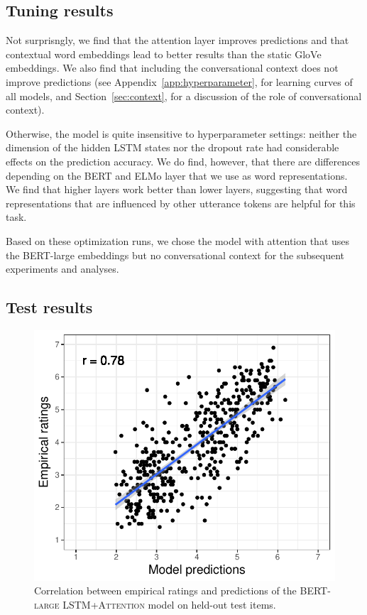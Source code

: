 \documentclass[11pt,a4paper]{article}
\begin{document}
\subsection{Tuning results}

Not surprisngly, we find that the attention layer improves predictions and that contextual word embeddings lead to better results than the static GloVe
embeddings. We also find that including the conversational context does not improve predictions (see Appendix~\ref{app:hyperparameter}, for learning curves of all models, and Section~\ref{sec:context}, for a discussion of the role of conversational context).

Otherwise, the model is quite insensitive to hyperparameter settings: neither the dimension of the hidden LSTM states nor the dropout rate had considerable effects
on the prediction accuracy. We do find, however, that there are differences depending on the BERT and ELMo layer that we use as word representations.
We find that higher layers work better than lower layers, suggesting that word representations that are influenced by other utterance tokens are helpful for this 
task.%

Based on these optimization runs, we chose the model with attention that uses the BERT-large embeddings but no conversational context for the subsequent experiments and analyses.

\subsection{Test results}
\begin{figure}[t]
\center
\includegraphics[width=0.75\columnwidth]{./images/model-fit-eval.pdf}
\caption{Correlation between empirical ratings and predictions of the \textsc{BERT-large LSTM+Attention} model on held-out test items.}
	\label{fig:eval-correlations}
\end{figure}
\end{document}
